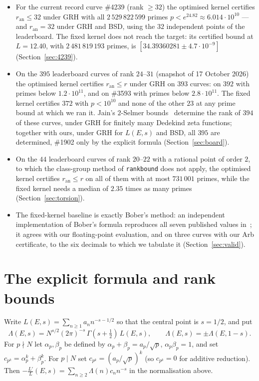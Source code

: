\documentclass[11pt]{amsart}
\theoremstyle{remark}
\theoremstyle{definition}
\newcommand{\ran}{r_{\mathrm{an}}}
\begin{document}
\begin{itemize}
\item For the current record curve \#4239 (rank $\ge32$) the optimised kernel certifies $\ran\le32$ under GRH with all $2\,529\,822\,599$ primes $p<e^{24.82}\approx6.014\cdot10^{10}$ --- and $\ran=32$ under GRH and BSD, using the $32$ independent points of the leaderboard. The fixed kernel does not reach the target: its certified bound at $L=12.40$, with
$2\,481\,819\,193$ primes, is $[34.39360281\pm4.7\cdot10^{-9}]$ (Section~\ref{sec:4239}).
\item On the $395$ leaderboard curves of rank $24$--$31$ (snapshot of 17 October 2026) the optimised kernel certifies $\ran\le r$ under GRH on $393$ curves: on $392$ with primes below $1.2\cdot10^{11}$, and on \#3593 with primes below $2.8\cdot10^{11}$. The fixed kernel certifies $372$ with $p<10^{10}$ and none of the other $23$ at any prime bound at which we ran it. Jain's $2$-Selmer bounds~\cite{Jain} determine the rank of $394$ of these curves, under GRH for finitely many Dedekind zeta functions; together with ours, under GRH for $L(E,s)$ and BSD, all $395$ are determined, \#1902 only by the explicit formula (Section~\ref{sec:board}).
\item On the $44$ leaderboard curves of rank $20$--$22$ with a rational point of order $2$, to which the class-group method of \texttt{rankbound} does not apply, the optimised kernel certifies $\ran\le r$ on all of them with at most $731\,001$ primes, while the fixed kernel needs a median of $2.35$ times as many primes (Section~\ref{sec:torsion}).
\item The fixed-kernel baseline is exactly Bober's method: an independent implementation of Bober's formula reproduces all seven published values in~\cite{Bober,KSW}; it agrees with our floating-point evaluation, and on three curves with our Arb certificate, to the six decimals to which we tabulate it (Section~\ref{sec:valid}).
\end{itemize}

\section{The explicit formula and rank bounds}

Write $L(E,s)=\sum_{n\ge1} a_n n^{-s-1/2}$ so that the central point is $s=1/2$, and put
\[
\Lambda(E,s) = N^{s/2}(2\pi)^{-s}\,\Gamma(s+\tfrac12)\,L(E,s), \qquad \Lambda(E,s)=\pm\Lambda(E,1-s).
\]
For $p\nmid N$ let $\alpha_p,\beta_p$ be defined by $\alpha_p+\beta_p=a_p/\sqrt p$, $\alpha_p\beta_p=1$, and set $c_{p^k}=\alpha_p^k+\beta_p^k$. For $p\mid N$ set $c_{p^k}=(a_p/\sqrt p)^k$ (so $c_{p^k}=0$ for additive reduction). Then $-\frac{L'}{L}(E,s)=\sum_{n\ge2}\Lambda(n)c_n n^{-s}$ in the normalisation above.
\end{document}

